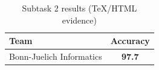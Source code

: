 \begin{table}[ht]
\centering
\small
\caption{Subtask 2 results (TeX/HTML evidence)}
\label{tab:subtask2_tex}
\begin{tabular}{lc}
\toprule
Team & Accuracy \\
\midrule
Bonn-Juelich Informatics & \textbf{97.7} \\
\bottomrule
\end{tabular}
\end{table}
